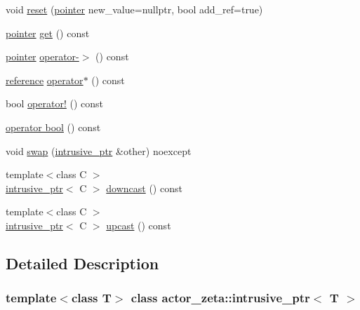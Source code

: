 \begin{DoxyCompactItemize}
\item 
void \hyperlink{classactor__zeta_1_1intrusive__ptr_a6931e58e1f64ea410eb72902714e0688}{reset} (\hyperlink{classactor__zeta_1_1intrusive__ptr_a149a1cdd3f154db67d7f53a371bfc4e4}{pointer} new\+\_\+value=nullptr, bool add\+\_\+ref=true)
\item 
\hyperlink{classactor__zeta_1_1intrusive__ptr_a149a1cdd3f154db67d7f53a371bfc4e4}{pointer} \hyperlink{classactor__zeta_1_1intrusive__ptr_ae393577a76eb877c94967b27654fe3cd}{get} () const
\item 
\hyperlink{classactor__zeta_1_1intrusive__ptr_a149a1cdd3f154db67d7f53a371bfc4e4}{pointer} \hyperlink{classactor__zeta_1_1intrusive__ptr_a8e3a67161e08ca4dbec5c069183fb89e}{operator-\/$>$} () const
\item 
\hyperlink{classactor__zeta_1_1intrusive__ptr_a016742eccc554bd6f7af0db0cf584abb}{reference} \hyperlink{classactor__zeta_1_1intrusive__ptr_a737d190410f26fb31e9a52c508a01711}{operator$\ast$} () const
\item 
bool \hyperlink{classactor__zeta_1_1intrusive__ptr_aa7082a7008b76847b64dbdf7be176cd9}{operator!} () const
\item 
\hyperlink{classactor__zeta_1_1intrusive__ptr_a8d604f6ab26b980e438b8c3366efc503}{operator bool} () const
\item 
void \hyperlink{classactor__zeta_1_1intrusive__ptr_ac0375a24b86c60080e7a19c843d898a6}{swap} (\hyperlink{classactor__zeta_1_1intrusive__ptr}{intrusive\+\_\+ptr} \&other) noexcept
\item 
{\footnotesize template$<$class C $>$ }\\\hyperlink{classactor__zeta_1_1intrusive__ptr}{intrusive\+\_\+ptr}$<$ C $>$ \hyperlink{classactor__zeta_1_1intrusive__ptr_a5a252da64a663dc6b8832c3355057e6e}{downcast} () const
\item 
{\footnotesize template$<$class C $>$ }\\\hyperlink{classactor__zeta_1_1intrusive__ptr}{intrusive\+\_\+ptr}$<$ C $>$ \hyperlink{classactor__zeta_1_1intrusive__ptr_a7ac6896bf79b51a33c44156db03d0c57}{upcast} () const
\end{DoxyCompactItemize}


\subsection{Detailed Description}
\subsubsection*{template$<$class T$>$\newline
class actor\+\_\+zeta\+::intrusive\+\_\+ptr$<$ T $>$}

